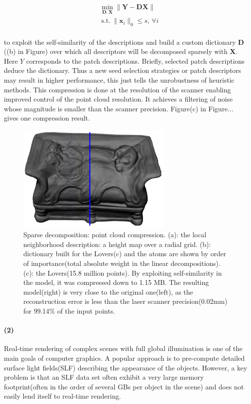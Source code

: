 \small{
\begin{equation}
\label{eq:dictcompression}
\begin{split}
&\min_{\mathbf{D},\mathbf{X}}  \|\mathbf{Y}-\mathbf{D}\mathbf{X}\| \\
&~\mathrm{s.t.}~ \|\mathbf{x}_i\|_0 \leq s,\,\forall i
\end{split}
\end{equation}
}
\\
to exploit the self-similarity of the descriptions and build a custom dictionary $\mathbf{D}$((b) in Figure) over which all descriptors will be decomposed sparsely with $\mathbf{X}$.
Here $Y$ corresponds to the patch descriptions.
Briefly, selected patch descriptions deduce the dictionary.
Thus a new seed selection strategies or patch descriptors may result in higher performance,
this just tells the unrobustness of heuristic methods.
This compression is done at the resolution of the scanner enabling improved control of the point cloud resolution.
It achieves a filtering of noise whose magnitude is smaller than the scanner precision.
Figure(c) in Figure... gives one compression result.

\begin{figure}[ht]
  \centering
  \includegraphics[width=3.0in]{images/compression_learning}
  \caption{Sparse decomposition: point cloud compression\cite{digne2014self}. (a): the local neighborhood description: a height map over a radial grid. (b): dictionary built for the Lovers(c) and the atoms are shown by order of importance(total absolute weight in the linear decompositions). (c): the Lovers(15.8 million points). By exploiting self-similarity in the model, it was compressed down to 1.15 MB. The resulting model(right) is very close to the original one(left), as the reconstruction error is less than the laser scanner precision(0.02mm) for 99.14\% of the input points.}
\end{figure}


\paragraph{(2)}
Real-time rendering of complex scenes with full global illumination is one of the main goals of computer graphics.
A popular approach is to pre-compute detailed surface light fields(SLF) describing the appearance of the objects.
However, a key problem is that an SLF data set often exhibit a very large memory footprint(often in the order of several GBs per object in the scene) and does not easily lend itself to real-time rendering.


